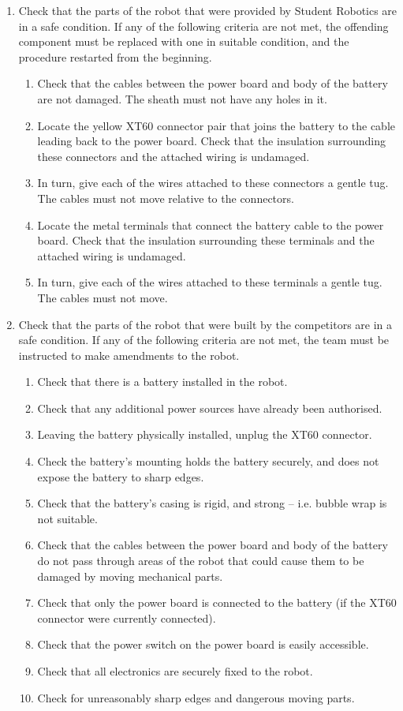 \begin{enumerate}
  \item Check that the parts of the robot that were provided by Student Robotics
  are in a safe condition. If any of the following criteria are not met, the
  offending component must be replaced with one in suitable condition, and the
  procedure restarted from the beginning.
  \begin{enumerate}
    \item Check that the cables between the power board and body of the battery
    are not damaged. The sheath must not have any holes in it.
    \item Locate the yellow XT60 connector pair that joins the battery to the
    cable leading back to the power board. Check that the insulation surrounding
    these connectors and the attached wiring is undamaged.
    \item In turn, give each of the wires attached to these connectors a gentle
    tug. The cables must not move relative to the connectors.
    \item Locate the metal terminals that connect the battery cable to the power
    board. Check that the insulation surrounding these terminals and the
    attached wiring is undamaged.
    \item In turn, give each of the wires attached to these terminals a gentle
    tug. The cables must not move.
  \end{enumerate}
  \item Check that the parts of the robot that were built by the competitors are
  in a safe condition. If any of the following criteria are not met, the team
  must be instructed to make amendments to the robot.
  \begin{enumerate}
    \item Check that there is a battery installed in the robot.
    \item Check that any additional power sources have already been authorised.
    \item Leaving the battery physically installed, unplug the XT60 connector.
    \item Check the battery's mounting holds the battery securely, and does not
    expose the battery to sharp edges.
    \item Check that the battery's casing is rigid, and strong -- i.e. bubble
    wrap is not suitable.
    \item Check that the cables between the power board and body of the battery
    do not pass through areas of the robot that could cause them to be damaged
    by moving mechanical parts.
    \item Check that only the power board is connected to the battery (if the
    XT60 connector were currently connected).
    \item Check that the power switch on the power board is easily accessible.
    \item Check that all electronics are securely fixed to the robot.
    \item Check for unreasonably sharp edges and dangerous moving parts.
  \end{enumerate}
\end{enumerate}
